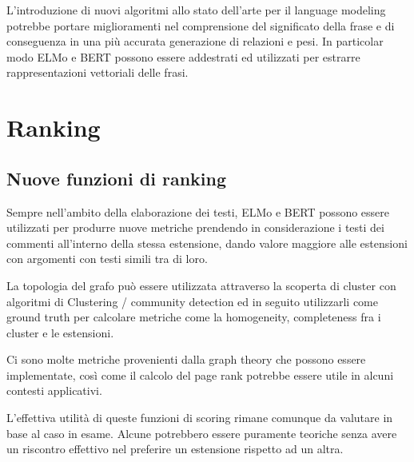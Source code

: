 L'introduzione di nuovi algoritmi allo stato dell'arte per il language modeling potrebbe portare miglioramenti nel comprensione del significato della frase e di conseguenza in una più accurata generazione di relazioni e pesi. In particolar modo ELMo \cite{elmo} e BERT \cite{bert} possono essere addestrati ed utilizzati per estrarre rappresentazioni vettoriali delle frasi.





\section {Ranking}

\subsection {Nuove funzioni di ranking}

Sempre nell'ambito della elaborazione dei testi, ELMo \cite{elmo} e BERT \cite{bert} possono essere utilizzati per produrre nuove metriche prendendo in considerazione i testi dei commenti all'interno della stessa estensione, dando valore maggiore alle estensioni con argomenti con testi simili tra di loro.

La topologia del grafo può essere utilizzata attraverso la scoperta di cluster con algoritmi di Clustering / community detection ed in seguito utilizzarli come ground truth per calcolare metriche come la homogeneity, completeness fra i cluster e le estensioni. 

Ci sono molte metriche provenienti dalla graph theory che possono essere implementate, così come il calcolo del page rank potrebbe essere utile in alcuni contesti applicativi.

L'effettiva utilità di queste funzioni di scoring rimane comunque da valutare in base al caso in esame. Alcune potrebbero essere puramente teoriche senza avere un riscontro effettivo nel preferire un estensione rispetto ad un altra.
